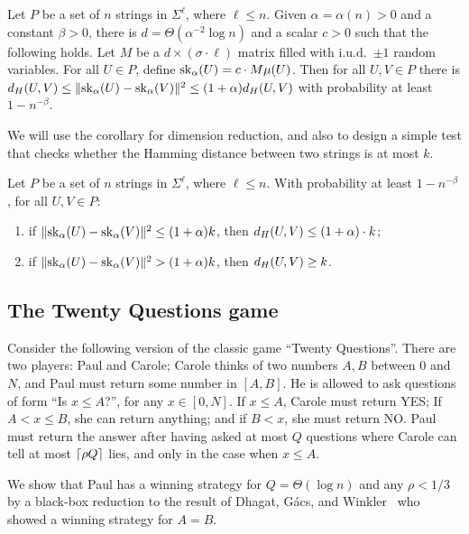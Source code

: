 \begin{corollary}\label{cor:dim_reduction}
Let $P$ be a set of $n$ strings in $\Sigma^{\ell}$, where $\ell \le n$. Given $\alpha = \alpha(n) > 0$ and a constant $\beta > 0$, there is $d = \Theta(\alpha^{-2}\log n)$ and a scalar $c > 0$ such that the following holds. Let $M$ be a $d \times (\sigma \cdot \ell)$ matrix filled with i.u.d.\ $\pm1$ random variables. For all $U \in P$, define $\mathrm{sk}_\alpha(U) = c\cdot M \mu(U)$. Then for all $U, V \in P$ there is $d_H(U,V) \leq \lVert\mathrm{sk}_\alpha(U) - \mathrm{sk}_\alpha(V)\rVert^2 \leq (1+\alpha) d_H(U, V)$ with probability at least $1- n^{-\beta}$.
\end{corollary}

We will use the corollary for dimension reduction, and also to design a simple test that checks whether the Hamming distance between two strings is at most $k$. 

\begin{corollary}
Let $P$ be a set of $n$ strings in $\Sigma^{\ell}$, where $\ell \le n$. With probability at least $1- n^{-\beta}$, for all $U, V \in P$:
\begin{enumerate}[label=\arabic*)]
\item if $\lVert\mathrm{sk}_\alpha(U)-\mathrm{sk}_\alpha(V)\rVert^2 \le (1+\alpha) k$, then $d_H(U, V) \le (1+\alpha) \cdot k$;
\item if $\lVert\mathrm{sk}_\alpha(U)-\mathrm{sk}_\alpha(V)\rVert^2 > (1+\alpha) k$, then $d_H(U, V) \ge k$.
\end{enumerate}
\end{corollary}

\subsection{The Twenty Questions game}
\label{lcs:sec:20questions}
Consider the following version of the classic game ``Twenty Questions''. There are two players: Paul and Carole; Carole thinks of two numbers $A, B$ between $0$ and $N$, and Paul must return some number in $[A,B]$. He is allowed to ask questions of form ``Is $x \le A$?'', for any $x \in [0,N]$. If $x \le A$, Carole must return YES; If $A < x \le B$, she can return anything; and if $B < x$, she must return NO. Paul must return the answer after having asked at most $Q$ questions where Carole can tell at most $\lceil \rho Q \rceil$ lies, and only in the case when $x \le A$.  

We show that Paul has a winning strategy for $Q = \Theta (\log n)$ and any $\rho < 1/3$ by a black-box reduction to the result of Dhagat, G{\'a}cs, and Winkler~\cite{Dhagat:1992:PLQ:139404.139409} who showed a winning strategy for $A = B$.

